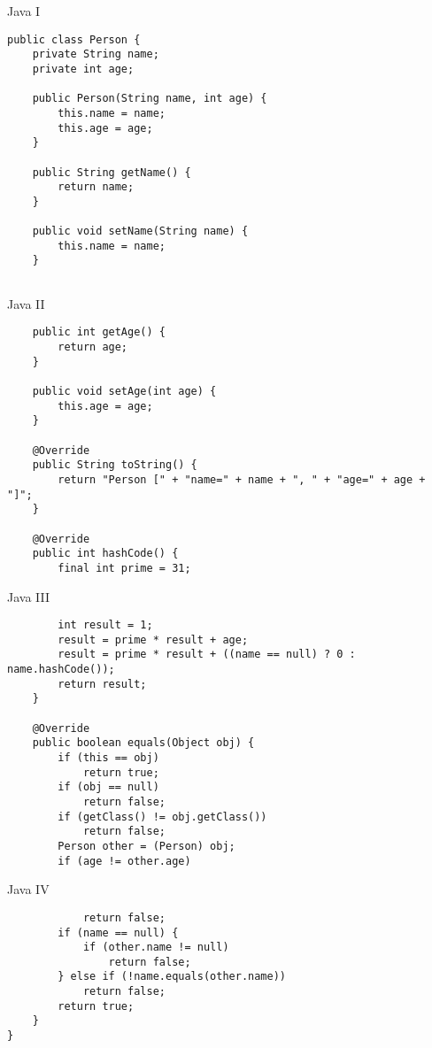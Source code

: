 \documentclass[10pt]{beamer}
\begin{document}
	\begin{frame}[fragile]{Java I}
		\begin{verbatim}
public class Person {
	private String name;
	private int age;
	
	public Person(String name, int age) {
		this.name = name;
		this.age = age;
	}
	
	public String getName() {
		return name;
	}
	
	public void setName(String name) {
		this.name = name;
	}
	
		\end{verbatim}
\end{frame}
	\begin{frame}[fragile]{Java II}
		\begin{verbatim}
	public int getAge() {
		return age;
	}
	
	public void setAge(int age) {
		this.age = age;
	}
	
	@Override
	public String toString() {
		return "Person [" + "name=" + name + ", " +	"age=" + age + "]";
	}
	
	@Override
	public int hashCode() {
		final int prime = 31;
		\end{verbatim}
\end{frame}
	\begin{frame}[fragile]{Java III}
		\begin{verbatim}
		int result = 1;
		result = prime * result + age;
		result = prime * result + ((name == null) ? 0 : name.hashCode());
		return result;
	}
	
	@Override
	public boolean equals(Object obj) {
		if (this == obj)
			return true;
		if (obj == null)
			return false;
		if (getClass() != obj.getClass())
			return false;
		Person other = (Person) obj;
		if (age != other.age)
		\end{verbatim}
\end{frame}
	\begin{frame}[fragile]{Java IV}
		\vspace{-2.5cm}
		\begin{verbatim}
			return false;
		if (name == null) {
			if (other.name != null)
				return false;
		} else if (!name.equals(other.name))
			return false;
		return true;
	}
}
		\end{verbatim}
\end{frame}
	
\end{document}

